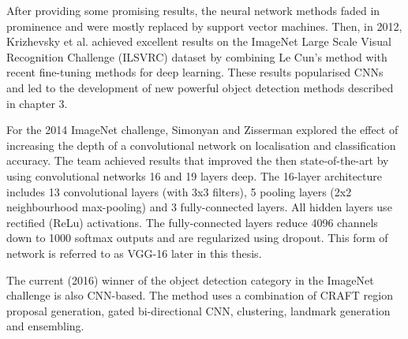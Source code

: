 After providing some promising results, the neural network methods faded in prominence and were mostly replaced by support vector machines. Then, in 2012, Krizhevsky et al. achieved excellent results on the ImageNet Large Scale Visual Recognition Challenge (ILSVRC) dataset by combining Le Cun’s method with recent fine-tuning methods for deep learning. These results popularised CNNs and led to the development of new powerful object detection methods described in chapter 3.

For the 2014 ImageNet challenge, Simonyan and Zisserman explored the effect of increasing the depth of a convolutional network on localisation and classification accuracy. The team achieved results that improved the then state-of-the-art by using convolutional networks 16 and 19 layers deep. The 16-layer architecture includes 13 convolutional layers (with 3x3 filters), 5 pooling layers (2x2 neighbourhood max-pooling) and 3 fully-connected layers. All hidden layers use rectified (ReLu) activations. The fully-connected layers reduce 4096 channels down to 1000 softmax outputs and are regularized using dropout. This form of network is referred to as VGG-16 later in this thesis.

The current (2016) winner of the object detection category in the ImageNet challenge is also CNN-based. The method uses a combination of CRAFT region proposal generation, gated bi-directional CNN, clustering, landmark generation and ensembling.

 
